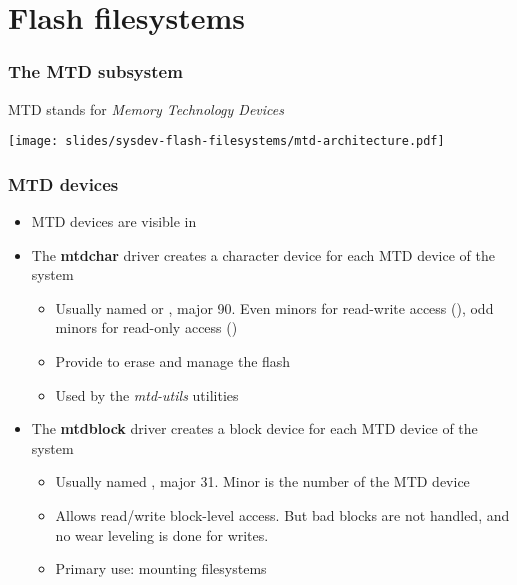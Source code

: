 \section{Flash filesystems}

\begin{frame}
  \frametitle{The MTD subsystem}
  MTD stands for {\em Memory Technology Devices}
  \begin{center}
    \texttt{[image: slides/sysdev-flash-filesystems/mtd-architecture.pdf]}
  \end{center}
\end{frame}

\begin{frame}
  \frametitle{MTD devices}
  \begin{itemize}
  \item MTD devices are visible in 
  \item The {\bf mtdchar} driver creates a character device for each
    MTD device of the system
    \begin{itemize}
    \item Usually named  or , major 90.
      Even minors for read-write access (),
      odd minors for read-only access ()
    \item Provide  to erase and manage the flash
    \item Used by the {\em mtd-utils} utilities
    \end{itemize}
  \item The {\bf mtdblock} driver creates a block device for each MTD
    device of the system
    \begin{itemize}
    \item Usually named , major 31. Minor is the
      number of the MTD device
    \item Allows read/write block-level access. But bad blocks are not
      handled, and no wear leveling is done for writes.
    \item Primary use: mounting filesystems
    \end{itemize}
  \end{itemize}
\end{frame}

